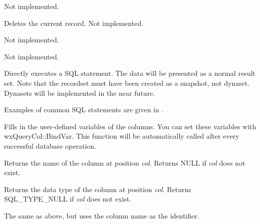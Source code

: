 

Not implemented.



Deletes the current record. Not implemented.



Not implemented.



Not implemented.

\label{wxrecordsetexecutesql}


Directly executes a SQL statement. The data will be presented as a normal
result set. Note that the recordset must have been created as a snapshot, not
dynaset. Dynasets will be implemented in the near future.

Examples of common SQL statements are given in .



Fills in the user-defined variables of the columns. You can set these
variables with wxQueryCol::BindVar. This function will be automatically
called after every successful database operation.



Returns the name of the column at position {\it col}. Returns NULL if {\it col} does not
exist.



Returns the data type of the column at position {\it col}. Returns SQL\_TYPE\_NULL
if {\it col} does not exist.


The same as above, but uses the column name as the identifier.

